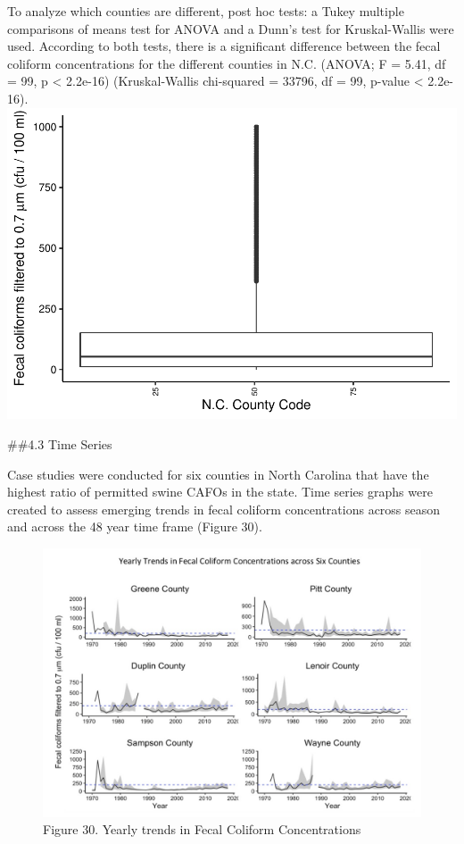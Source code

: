 \documentclass[12pt,]{article}
\begin{document}
To analyze which counties are different, post hoc tests: a Tukey
multiple comparisons of means test for ANOVA and a Dunn's test for
Kruskal-Wallis were used. According to both tests, there is a
significant difference between the fecal coliform concentrations for the
different counties in N.C. (ANOVA; F = 5.41, df = 99, p \textless{}
2.2e-16) (Kruskal-Wallis chi-squared = 33796, df = 99, p-value
\textless{} 2.2e-16).
\includegraphics{Edmondson_ENV872_Project_files/figure-latex/unnamed-chunk-27-1.pdf}

\#\#4.3 Time Series

Case studies were conducted for six counties in North Carolina that have
the highest ratio of permitted swine CAFOs in the state. Time series
graphs were created to assess emerging trends in fecal coliform
concentrations across season and across the 48 year time frame (Figure
30).

\begin{figure}
\centering
\includegraphics{Yearly_trends.png}
\caption{Figure 30. Yearly trends in Fecal Coliform Concentrations}
\end{figure}
\end{document}
